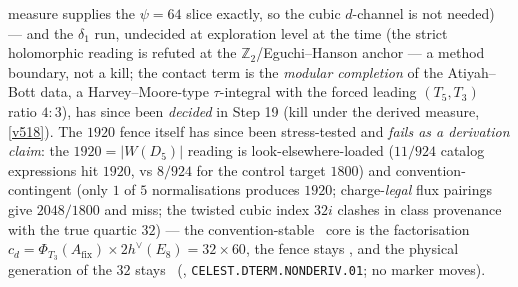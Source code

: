 \documentclass[11pt,a4paper]{article}
\newcommand{\Z}{\mathbb{Z}}
\theoremstyle{definition}
\begin{document}
measure supplies the $\psi=64$ slice exactly, so the cubic $d$-channel is not needed) --- and
the $\delta_1$ run, undecided at exploration level at the time
(the strict holomorphic reading is refuted at the $\Z_2$/Eguchi--Hanson anchor --- a method
boundary, not a kill; the contact term is the \emph{modular completion} of the Atiyah--Bott data,
a Harvey--Moore-type $\tau$-integral with the forced leading $(T_5,T_3)$ ratio $4{:}3$), has
since been \emph{decided} in Step 19 (kill under the derived measure, \vref{v518}).
The $1920$ fence itself has since been stress-tested and \emph{fails as a derivation claim}: the
$1920=|W(D_5)|$ reading is look-elsewhere-loaded ($11/924$ catalog expressions hit $1920$, vs
$8/924$ for the control target $1800$) and convention-contingent (only $1$ of $5$ normalisations
produces $1920$; charge-\emph{legal} flux pairings give $2048/1800$ and miss; the twisted cubic
index $32i$ clashes in class provenance with the true quartic $32$) --- the convention-stable
\mE\ core is the factorisation $c_d=\Phi_{T_3}(A_{\mathrm{fix}})\times2h^\vee(E_8)=32\times60$,
the fence stays \mC, and the physical generation of the $32$ stays \mO\
(, \texttt{CELEST.DTERM.NONDERIV.01}; no marker
moves).
\end{document}
